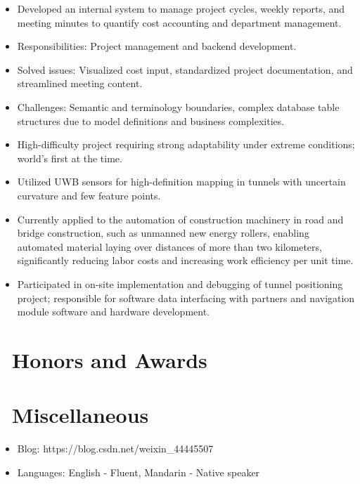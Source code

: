 \documentclass[a4paper,10pt]{resume}
\begin{document}
\begin{itemize}[parsep=0.5ex]
  \item Developed an internal system to manage project cycles, weekly reports, and meeting minutes to quantify cost accounting and department management.
  \item Responsibilities: Project management and backend development.
  \item Solved issues: Visualized cost input, standardized project documentation, and streamlined meeting content.
  \item Challenges: Semantic and terminology boundaries, complex database table structures due to model definitions and business complexities.
\end{itemize}

\begin{itemize}[parsep=0.5ex]
  \item High-difficulty project requiring strong adaptability under extreme conditions; world's first at the time.
  \item Utilized UWB sensors for high-definition mapping in tunnels with uncertain curvature and few feature points.
  \item Currently applied to the automation of construction machinery in road and bridge construction, such as unmanned new energy rollers, enabling automated material laying over distances of more than two kilometers, significantly reducing labor costs and increasing work efficiency per unit time.
  \item Participated in on-site implementation and debugging of tunnel positioning project; responsible for software data interfacing with partners and navigation module software and hardware development.
\end{itemize}

\section{\faHeartO\ Honors and Awards}

\section{\faInfo\ Miscellaneous}
\begin{itemize}[parsep=0.5ex]
  \item Blog: https://blog.csdn.net/weixin\_44445507
  \item Languages: English - Fluent, Mandarin - Native speaker
\end{itemize}

%
%
\end{document}
